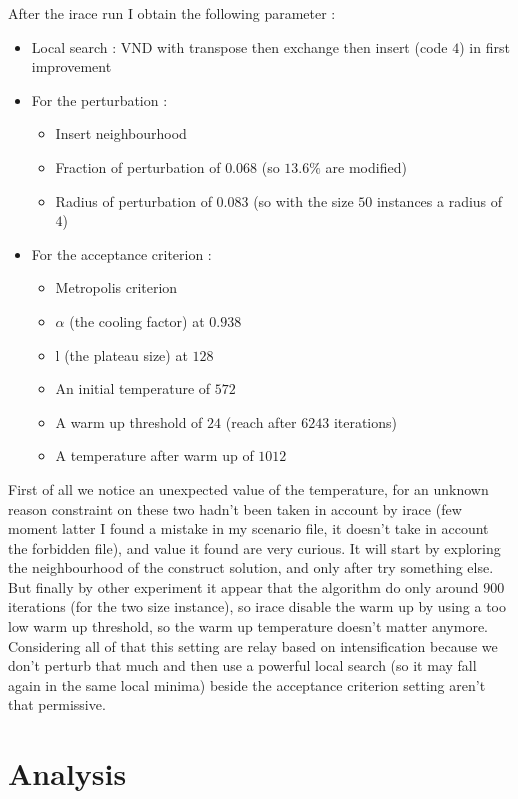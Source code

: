 \documentclass[12pt,a4paper]{article}
\begin{document}
After the irace run I obtain the following parameter :
\begin{itemize}
\item
Local search : VND with transpose then exchange then insert (code $4$) in first improvement
\item
For the perturbation :
\begin{itemize}
\item
Insert neighbourhood
\item
Fraction of perturbation of $0.068$ (so $13.6 \%$ are modified)
\item
Radius of perturbation of $0.083$ (so with the size $50$ instances a radius of $4$)
\end{itemize}
\item
For the acceptance criterion :
\begin{itemize}
\item
Metropolis criterion
\item
$\alpha$ (the cooling factor) at $0.938$
\item
l (the plateau size) at $128$
\item
An initial temperature of $572$
\item
A warm up threshold of $24$ (reach after $6243$ iterations)
\item
A temperature after warm up of $1012$
\end{itemize}
\end{itemize}
First of all we notice an unexpected value of the temperature, for an unknown reason constraint on these two hadn't been taken in account by irace (few moment latter I found a mistake in my scenario file, it doesn't take in account the forbidden file), and value it found are very curious. It will start by exploring the neighbourhood of the construct solution, and only after try something else. But finally by other experiment it appear that the algorithm do only around $900$ iterations (for the two size instance), so irace disable the warm up by using a too low warm up threshold, so the warm up temperature doesn't matter anymore. Considering all of that this setting are relay based on intensification because we don't perturb that much and then use a powerful local search (so it may fall again in the same local minima) beside the acceptance criterion setting aren't that permissive.

\section{Analysis}
\end{document}
